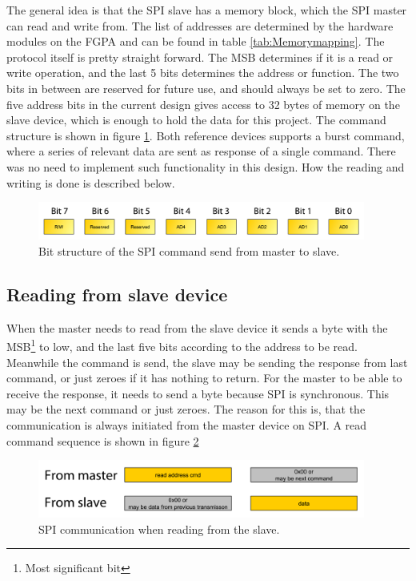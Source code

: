 The general idea is that the SPI slave has a memory block, which the SPI master can read and write from. The list of addresses are determined by the hardware modules on the FGPA and can be found in table \ref{tab:Memorymapping}. The protocol itself is pretty straight forward. The MSB determines if it is a read or write operation, and the last 5 bits determines the address or function. The two bits in between are reserved for future use, and should always be set to zero. The five address bits in the current design gives access to 32 bytes of memory on the slave device, which is enough to hold the data for this project. The command structure is shown in figure \ref{fig:spi_protocol_cmd_structure}. Both reference devices supports a burst command, where a series of relevant data are sent as response of a single command. There was no need to implement such functionality in this design. How the reading and writing is done is described below.
\begin{figure}[htb]
	\centering
	\includegraphics[width=0.96\textwidth,trim=0 0 0 0]{graphics/spi_protocol_cmd_structure.pdf} %
	\caption{Bit structure of the SPI command send from master to slave.}
	\label{fig:spi_protocol_cmd_structure}			%
\end{figure}


\subsection{Reading from slave device}
When the master needs to read from the slave device it sends a byte with the MSB\footnote{Most significant bit} to low, and the last five bits according to the address to be read. Meanwhile the command is send, the slave may be sending the response from last command, or just zeroes if it has nothing to return. For the master to be able to receive the response, it needs to send a byte because SPI is synchronous. This may be the next command or just zeroes. The reason for this is, that the communication is always initiated from the master device on SPI. A read command sequence is shown in figure \ref{fig:spi_protocol_command_structure_read} 

\begin{figure}[htb]
	\centering
	\includegraphics[width=0.96\textwidth]{graphics/spi_protocol_command_structure_read_wlabels.pdf} %
	\caption{SPI communication when reading from the slave.}
	\label{fig:spi_protocol_command_structure_read}			%
\end{figure}


